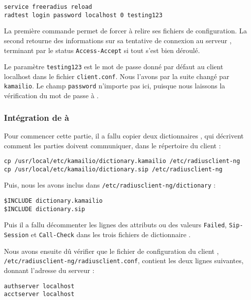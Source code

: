 \begin{verbatim}
service freeradius reload
radtest login password localhost 0 testing123
\end{verbatim}

La première commande permet de forcer {\frad} à relire ses fichiers de configuration. La second retourne des informations sur sa tentative de connexion au serveur {\frad}, terminant par le status \texttt{Access-Accept} si tout s’est bien déroulé.

Le paramètre \texttt{testing123} est le mot de passe donné par défaut au client localhost dans le fichier \texttt{client.conf}. Nous l'avons par la suite changé par \texttt{kamailio}. Le champ \texttt{password} n’importe pas ici, puisque nous laissons la vérification du mot de passe à {\kam}.

\subsubsection{Intégration de {\rad} à {\kam}}

Pour commencer cette partie, il a fallu copier deux dictionnaires {\rad}, qui décrivent comment les parties doivent communiquer, dans le répertoire du client {\rad} :

\begin{small}
\begin{verbatim}
cp /usr/local/etc/kamailio/dictionary.kamailio /etc/radiusclient-ng
cp /usr/local/etc/kamailio/dictionary.sip /etc/radiusclient-ng
\end{verbatim}
\end{small}

Puis, nous les avons inclus dans \texttt{/etc/radiusclient-ng/dictionary} :

\begin{verbatim}
$INCLUDE dictionary.kamailio
$INCLUDE dictionary.sip
\end{verbatim}

Puis il a fallu décommenter les lignes des attributs ou des valeurs \texttt{Failed}, \texttt{Sip-Session} et \texttt{Call-Check} dans les trois fichiers de dictionnaire {\rad}.

\newpage

Nous avons ensuite dû vérifier que le fichier de configuration du client {\rad}, \texttt{/etc/radiusclient-ng/radiusclient.conf}, contient les deux lignes suivantes, donnant l'adresse du serveur {\rad} :

\begin{verbatim}
authserver localhost
acctserver localhost
\end{verbatim}

